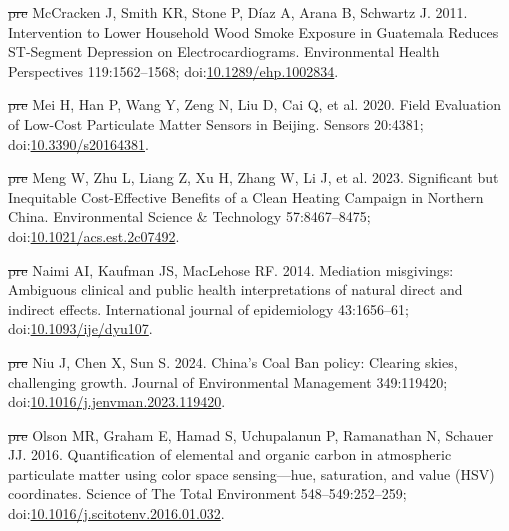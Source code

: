 \documentclass[
  letterpaper,
  DIV=11,
  numbers=noendperiod]{scrartcl}
\newlength{\cslhangindent}
\newenvironment{CSLReferences}[2] %
 {\begin{list}{}{%
  \setlength{\itemindent}{0pt} %
  \setlength{\leftmargin}{0pt} %
  \setlength{\parsep}{0pt} %
  \ifodd #1
   \setlength{\leftmargin}{\cslhangindent} %
   \setlength{\itemindent}{-1\cslhangindent} %
  \fi
  \setlength{\itemsep}{#2\baselineskip}}} %
 {\end{list}} %
\providecommand{\DIFdeltex}[1]{{\protect\color{red}\sout{#1}}}                      %
\providecommand{\DIFaddbegin}{} %
\providecommand{\DIFaddend}{} %
\providecommand{\DIFdelbegin}{} %
\providecommand{\DIFdelend}{} %
\providecommand{\DIFdel}[1]{\texorpdfstring{\DIFdeltex{#1}}{}} %
\newcommand{\DIFscaledelfig}{0.5}
\newlength{\DIFdelgraphicswidth} %
\newlength{\DIFdelgraphicsheight} %
\newcommand{\DIFaddincludegraphics}[2][]{{\color{blue}\fbox{\DIFOincludegraphics[#1]{#2}}}} %
\newcommand{\DIFdelincludegraphics}[2][]{%
\sbox{\DIFdelgraphicsbox}{\DIFOincludegraphics[#1]{#2}}%
\settoboxwidth{\DIFdelgraphicswidth}{\DIFdelgraphicsbox} %
\settoboxtotalheight{\DIFdelgraphicsheight}{\DIFdelgraphicsbox} %
\scalebox{\DIFscaledelfig}{%
\parbox[b]{\DIFdelgraphicswidth}{\usebox{\DIFdelgraphicsbox}\\[-\baselineskip] \rule{\DIFdelgraphicswidth}{0em}}\llap{\resizebox{\DIFdelgraphicswidth}{\DIFdelgraphicsheight}{%
\setlength{\unitlength}{\DIFdelgraphicswidth}%
\begin{picture}(1,1)%
\thicklines\linethickness{2pt} %
{\color[rgb]{1,0,0}\put(0,0){\framebox(1,1){}}}%
{\color[rgb]{1,0,0}\put(0,0){\line( 1,1){1}}}%
{\color[rgb]{1,0,0}\put(0,1){\line(1,-1){1}}}%
\end{picture}%
}\hspace*{3pt}}} %
} %
\DeclareRobustCommand{\DIFaddbegin}{\DIFOaddbegin \let\includegraphics\DIFaddincludegraphics} %
\DeclareRobustCommand{\DIFaddend}{\DIFOaddend \let\includegraphics\DIFOincludegraphics} %
\DeclareRobustCommand{\DIFdelbegin}{\DIFOdelbegin \let\includegraphics\DIFdelincludegraphics} %
\DeclareRobustCommand{\DIFdelend}{\DIFOaddend \let\includegraphics\DIFOincludegraphics} %
\begin{document}
\begin{CSLReferences}{1}{1}
\DIFdelbegin %
\DIFdel{pre}%
\DIFdelend \DIFaddbegin {}
\DIFaddend McCracken J, Smith KR, Stone P, Díaz A, Arana B, Schwartz J. 2011.
Intervention to {Lower Household Wood Smoke Exposure} in {Guatemala
Reduces ST-Segment Depression} on {Electrocardiograms}. Environmental
Health Perspectives 119:1562--1568;
doi:\href{https://doi.org/10.1289/ehp.1002834}{10.1289/ehp.1002834}.

\DIFdelbegin %
\DIFdel{pre}%
\DIFdelend \DIFaddbegin {}
\DIFaddend Mei H, Han P, Wang Y, Zeng N, Liu D, Cai Q, et al. 2020. Field
{Evaluation} of {Low-Cost Particulate Matter Sensors} in {Beijing}.
Sensors 20:4381;
doi:\href{https://doi.org/10.3390/s20164381}{10.3390/s20164381}.

\DIFdelbegin %
\DIFdel{pre}%
\DIFdelend \DIFaddbegin {}
\DIFaddend Meng W, Zhu L, Liang Z, Xu H, Zhang W, Li J, et al. 2023. Significant
but {Inequitable Cost-Effective Benefits} of a {Clean Heating Campaign}
in {Northern China}. Environmental Science \& Technology 57:8467--8475;
doi:\href{https://doi.org/10.1021/acs.est.2c07492}{10.1021/acs.est.2c07492}.

\DIFdelbegin %
\DIFdel{pre}%
\DIFdelend \DIFaddbegin {}
\DIFaddend Naimi AI, Kaufman JS, MacLehose RF. 2014. Mediation misgivings:
Ambiguous clinical and public health interpretations of natural direct
and indirect effects. International journal of epidemiology 43:1656--61;
doi:\href{https://doi.org/10.1093/ije/dyu107}{10.1093/ije/dyu107}.

\DIFdelbegin %
\DIFdel{pre}%
\DIFdelend \DIFaddbegin {}
\DIFaddend Niu J, Chen X, Sun S. 2024. China's {Coal Ban} policy: {Clearing} skies,
challenging growth. Journal of Environmental Management 349:119420;
doi:\href{https://doi.org/10.1016/j.jenvman.2023.119420}{10.1016/j.jenvman.2023.119420}.

\DIFdelbegin %
\DIFdel{pre}%
\DIFdelend \DIFaddbegin {}
\DIFaddend Olson MR, Graham E, Hamad S, Uchupalanun P, Ramanathan N, Schauer JJ.
2016. Quantification of elemental and organic carbon in atmospheric
particulate matter using color space sensing---hue, saturation, and
value ({HSV}) coordinates. Science of The Total Environment
548--549:252--259;
doi:\href{https://doi.org/10.1016/j.scitotenv.2016.01.032}{10.1016/j.scitotenv.2016.01.032}.


\end{CSLReferences}
\end{document}
